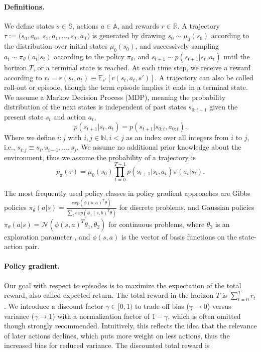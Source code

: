 \paragraph{Definitions.} 
We define states $s \in \mathbb{S}$, actions $a \in \mathbb{A}$, and rewards $r \in \mathbb{R}$. 
A trajectory $\tau := (s_0, a_0, $ $s_1, a_1, \dots, s_T, a_T)$ is generated by drawing $s_0 \sim \mu_0(s_0)$ according to the distribution over initial states $\mu_0(s_0)$, and successively sampling $a_t \sim \pi_\theta(a_t|s_t)$ according to the policy $\pi_\theta$, and $s_{t+1} \sim p(s_{t+1}|s_t,a_t)$ until the horizon $T$, or a terminal state is reached. 
At each time step, we receive a reward according to $r_t = r(s_t, a_t) \equiv \mathbb{E}_{s'}\left[r(s_t,a_t,s')\right]$. 
A trajectory can also be called roll-out or episode, though the term episode implies it ends in a terminal state.
We assume a Markov Decision Process (MDP), meaning the probability distribution of the next states is independent of past states $s_{0:t-1}$ given the present state $s_t$ and action $a_t$, 
\begin{equation}
	p(s_{t+1}|s_t,a_t)=p(s_{t+1}|s_{0:t},a_{0:t}).
\end{equation}
Where we define $i:j$ with $i,j \in \mathbb{N}, i < j$ as an index over all integers from $i$ to $j$, i.e., $s_{i:j} \equiv s_i, s_{i+1}, \dots, s_j$. 
We assume no additional prior knowledge about the environment, thus we assume the probability of a trajectory is 
\begin{equation}
	p_\pi(\tau) = \mu_0(s_0) \prod_{t=0}^{T-1} p(s_{t+1}|s_t, a_t) \pi(a_t|s_t).
\end{equation}

The most frequently used policy classes in policy gradient approaches are Gibbs policies $\pi_\theta(a|s) = \frac{exp(\phi(s,a)^T\theta)}{\sum_b exp(\phi_1(s,b)^T\theta)}$ \cite{Sutton:1999:PGM:3009657.3009806,Bagnell2004LearningD} for discrete problems, and Gaussian policies $\pi_\theta(a|s) = \mathcal{N}(\phi(s,a)^T\theta_1,\theta_2)$ for continuous problems, where $\theta_2$ is an exploration parameter \cite{Williams92simplestatistical,peter:article:1996}, and $\phi(s,a)$ is the vector of basis functions on the state-action pair.

\paragraph{Policy gradient.} 
Our goal with respect to episodes is to maximize the expectation of the total reward, also called expected return. 
The total reward in the horizon $T$ is $\sum_{t=0}^{T} r_{t}$. 
We introduce a discount factor $\gamma \in [0,1)$ to trade-off bias ($\gamma\to0$) versus variance ($\gamma\to1$) with a normalization factor of $1-\gamma$, which is often omitted though strongly recommended.
Intuitively, this reflects the idea that the relevance of later actions declines, which puts more weight on less actions, thus the increased bias for reduced variance. 
The discounted total reward is 

